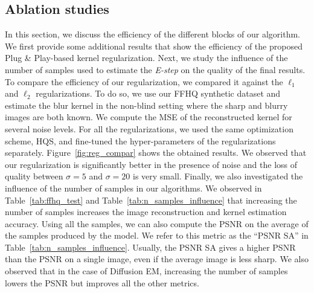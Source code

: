 \documentclass[10pt,twocolumn,letterpaper]{article}
\begin{document}
\subsection{Ablation studies}
%
\setlength{\tabcolsep}{6 pt}
\setlength{\textfloatsep}{15pt}
\begin{table}[]
    \centering
    \caption{Influence of the number of samples used to estimate the \textit{E-step} in Fast EM $\Pi$GDM. The image PSNR is computed on the first image of the batch.}
    \vspace{-10pt}
    \label{tab:n_samples_influence}
\end{table}
%
In this section, we discuss the efficiency of the different blocks of our algorithm. We first provide some additional results that show the efficiency of the proposed Plug \& Play-based kernel regularization. Next, we study the influence of the number of samples used to estimate the \textit{E-step} on the quality of the final results. 
%
To compare the efficiency of our regularization, we compared it against the $\ell_1$ and $\ell_2$ regularizations. To do so, we use our FFHQ synthetic dataset and estimate the blur kernel in the non-blind setting where the sharp and blurry images are both known. We compute the MSE of the reconstructed kernel for several noise levels. For all the regularizations, we used the same optimization scheme, HQS, and fine-tuned the hyper-parameters of the regularizations separately. Figure~\ref{fig:reg_compar} shows the obtained results.
%
We observed that our regularization is significantly better in the presence of noise and the loss of quality between $\sigma=5$ and $\sigma=20$ is very small. 
%
Finally, we also investigated the influence of the number of samples in our algorithms. We observed in Table~\ref{tab:ffhq_test} and Table~\ref{tab:n_samples_influence} that increasing the number of samples increases the image reconstruction and kernel estimation accuracy. Using all the samples, we can also compute the PSNR on the average of the samples produced by the model. We refer to this metric as the ``PSNR SA'' in Table~\ref{tab:n_samples_influence}. Usually, the PSNR SA gives a higher PSNR than the PSNR on a single image, even if the average image is less sharp. We also observed that in the case of Diffusion EM, increasing the number of samples lowers the PSNR but improves all the other metrics. 
\end{document}
